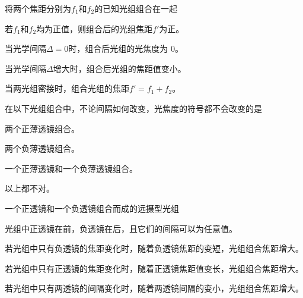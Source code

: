 \documentclass[standard, analysis, notocnum]{ExBook}
\newcommand{\answerarea}[1][8cm]{%
  \par\vspace{2mm}%
  \noindent{\color{themeColor!35}\rule{\linewidth}{0.4pt}}\par
  \noindent\begin{minipage}[t][#1][t]{\linewidth}\vspace{0pt}\end{minipage}\par
  \noindent{\color{themeColor!35}\rule{\linewidth}{0.4pt}}\par
}
\begin{document}
\begin{qitems}
\begin{bbox}
\answerarea[3.5cm]
\end{bbox}
\begin{bbox}
\qitem 将两个焦距分别为$f_{1}$和$f_{2}$的已知光组组合在一起
\par\noindent\hspace{2em}若$f_{1}$和$f_{2}$均为正值，则组合后的光组焦距$f'$为正。
\par\noindent\hspace{2em}当光学间隔$\Delta =0$时，组合后光组的光焦度为 0。
\par\noindent\hspace{2em}当光学间隔$\Delta$增大时，组合后光组的焦距值变小。
\par\noindent\hspace{2em}当两光组密接时，组合光组的焦距$f'=f_{1}+f_{2}$。
\answerarea[3.5cm]
\end{bbox}
\begin{bbox}
\qitem 在以下光组组合中，不论间隔如何改变，光焦度的符号都不会改变的是
\par\noindent\hspace{2em}两个正薄透镜组合。
\par\noindent\hspace{2em}两个负薄透镜组合。
\par\noindent\hspace{2em}一个正薄透镜和一个负薄透镜组合。
\par\noindent\hspace{2em}以上都不对。
\answerarea[3.5cm]
\end{bbox}
\begin{bbox}
\qitem 一个正透镜和一个负透镜组合而成的远摄型光组
\par\noindent\hspace{2em}光组中正透镜在前，负透镜在后，且它们的间隔可以为任意值。
\par\noindent\hspace{2em}若光组中只有负透镜的焦距变化时，随着负透镜焦距的变短，光组组合焦距增大。
\par\noindent\hspace{2em}若光组中只有正透镜的焦距变化时，随着正透镜焦距值变长，光组组合焦距增大。
\par\noindent\hspace{2em}若光组中只有两透镜的间隔变化时，随着两透镜间隔的变小，光组组合焦距增大。
\answerarea[3.5cm]
\end{bbox}
\begin{bbox}

\end{bbox}
\end{qitems}
\end{document}
